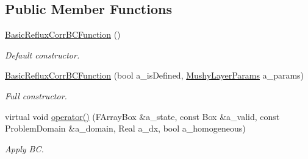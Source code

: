 \subsection*{Public Member Functions}
\begin{DoxyCompactItemize}
\item 
\hypertarget{class_basic_reflux_corr_b_c_function_a891b9aa97bcbdac51b3f0170c0608255}{\hyperlink{class_basic_reflux_corr_b_c_function_a891b9aa97bcbdac51b3f0170c0608255}{Basic\-Reflux\-Corr\-B\-C\-Function} ()}\label{class_basic_reflux_corr_b_c_function_a891b9aa97bcbdac51b3f0170c0608255}

\begin{DoxyCompactList}\small\item\em Default constructor. \end{DoxyCompactList}\item 
\hypertarget{class_basic_reflux_corr_b_c_function_a785a5780cdf367b9e945f8c991115b9d}{\hyperlink{class_basic_reflux_corr_b_c_function_a785a5780cdf367b9e945f8c991115b9d}{Basic\-Reflux\-Corr\-B\-C\-Function} (bool a\-\_\-is\-Defined, \hyperlink{class_mushy_layer_params}{Mushy\-Layer\-Params} a\-\_\-params)}\label{class_basic_reflux_corr_b_c_function_a785a5780cdf367b9e945f8c991115b9d}

\begin{DoxyCompactList}\small\item\em Full constructor. \end{DoxyCompactList}\item 
\hypertarget{class_basic_reflux_corr_b_c_function_a2c253616dd672bae591b3686d65270f3}{virtual void \hyperlink{class_basic_reflux_corr_b_c_function_a2c253616dd672bae591b3686d65270f3}{operator()} (F\-Array\-Box \&a\-\_\-state, const Box \&a\-\_\-valid, const Problem\-Domain \&a\-\_\-domain, Real a\-\_\-dx, bool a\-\_\-homogeneous)}\label{class_basic_reflux_corr_b_c_function_a2c253616dd672bae591b3686d65270f3}

\begin{DoxyCompactList}\small\item\em Apply B\-C. \end{DoxyCompactList}\end{DoxyCompactItemize}
